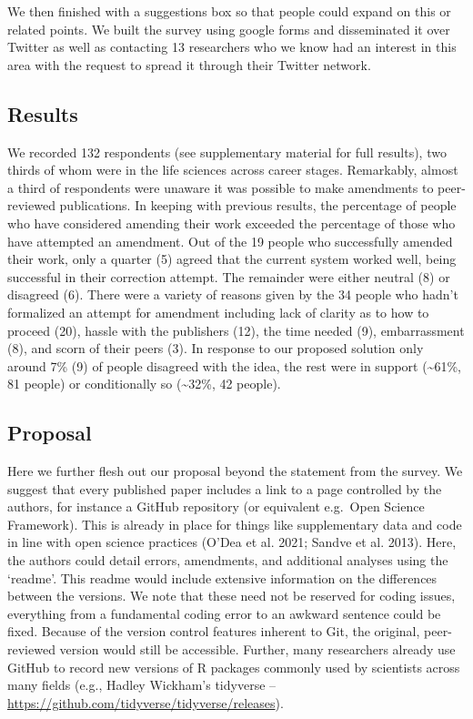 \documentclass[
]{article}
\begin{document}
We then finished with a suggestions box so that people could expand on
this or related points. We built the survey using google forms and
disseminated it over Twitter as well as contacting 13 researchers who we
know had an interest in this area with the request to spread it through
their Twitter network.

\hypertarget{results}{%
\subsection{Results}\label{results}}

We recorded 132 respondents (see supplementary material for full
results), two thirds of whom were in the life sciences across career
stages. Remarkably, almost a third of respondents were unaware it was
possible to make amendments to peer-reviewed publications. In keeping
with previous results, the percentage of people who have considered
amending their work exceeded the percentage of those who have attempted
an amendment. Out of the 19 people who successfully amended their work,
only a quarter (5) agreed that the current system worked well, being
successful in their correction attempt. The remainder were either
neutral (8) or disagreed (6). There were a variety of reasons given by
the 34 people who hadn't formalized an attempt for amendment including
lack of clarity as to how to proceed (20), hassle with the publishers
(12), the time needed (9), embarrassment (8), and scorn of their peers
(3). In response to our proposed solution only around 7\% (9) of people
disagreed with the idea, the rest were in support (\textasciitilde61\%,
81 people) or conditionally so (\textasciitilde32\%, 42 people).

\hypertarget{proposal}{%
\subsection{Proposal}\label{proposal}}

Here we further flesh out our proposal beyond the statement from the
survey. We suggest that every published paper includes a link to a page
controlled by the authors, for instance a GitHub repository (or
equivalent e.g.~Open Science Framework). This is already in place for
things like supplementary data and code in line with open science
practices (O'Dea et al. 2021; Sandve et al. 2013). Here, the authors
could detail errors, amendments, and additional analyses using the
`readme'. This readme would include extensive information on the
differences between the versions. We note that these need not be
reserved for coding issues, everything from a fundamental coding error
to an awkward sentence could be fixed. Because of the version control
features inherent to Git, the original, peer-reviewed version would
still be accessible. Further, many researchers already use GitHub to
record new versions of R packages commonly used by scientists across
many fields (e.g., Hadley Wickham's tidyverse --
\url{https://github.com/tidyverse/tidyverse/releases}).
\end{document}
